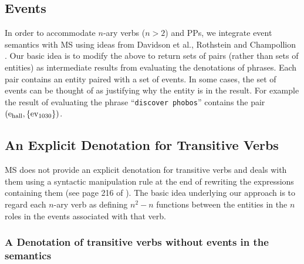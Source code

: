\documentclass[../main.tex]{subfiles}
\begin{document}
\begin{refsection}
\subsection{Events}

In order to accommodate $n$-ary verbs ($n > 2$) and PPs, we integrate event semantics
with MS using ideas from Davidson et al.\cite{davidson2012semantics}, Rothstein \cite{rothstein2008structuring} and Champollion \cite{champollion2015interaction}.
Our basic idea is to modify the above to return sets of pairs (rather than sets of entities) as intermediate
results from evaluating the denotations of phrases. Each pair contains an entity paired with a set of
events. In some cases, the set of events can be thought of as justifying why the entity is in the result.
For example the result of evaluating the phrase ``\texttt{discover phobos}'' contains the pair $(\mathrm{e}_{\operatorname{\operatorname{hall}}} , \{\operatorname{ev}_{1030}\})$.

\subsection{An Explicit Denotation for Transitive Verbs}

MS does not provide an explicit denotation for transitive verbs and deals with them using a syntactic
manipulation rule at the end of rewriting the expressions containing them (see page 216 of
\cite{Dowty:wall}).
The basic idea underlying our approach is to regard each $n$-ary verb as defining
$n^2 - n$ functions between the entities in the $n$ roles in the events associated with that verb.

\subsubsection{A Denotation of transitive verbs without events in the semantics}
\label{ext:transvbfdbr}


\end{refsection}
\end{document}
